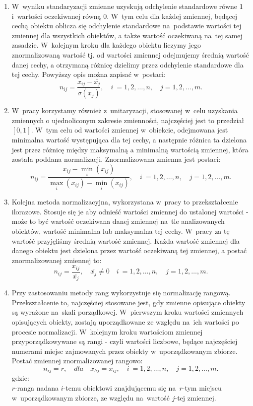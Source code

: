 \documentclass[12pt,a4paper]{report}
\begin{document}
\begin{enumerate}
\item W~wyniku standaryzacji zmienne uzyskują odchylenie standardowe równe 1 i~wartości oczekiwanej  równą 0. W~tym celu dla każdej zmiennej, będącej cechą obiektu oblicza się odchylenie standardowe na~podstawie wartości tej zmiennej dla wszystkich obiektów, a także wartość oczekiwaną na~tej samej zasadzie. W~kolejnym kroku dla każdego obiektu liczymy jego znormalizowaną wartość tj. od wartości zmiennej odejmujemy średnią wartość danej cechy, a otrzymaną różnicę dzielimy przez odchylenie standardowe dla tej cechy. Powyższy opis można zapisać w~postaci: 
$$
n_{ij}=\frac{x_{ij} - \overline{x_{j}}}{\sigma(x_j)}, \quad i~= 1,2, \ldots, n, \quad j=1,2,\ldots, m.
$$



\item W~pracy korzystamy również z~unitaryzacji, stosowanej w~celu uzyskania zmiennych o ujednoliconym zakresie zmienności, najczęściej jest to przedział $[0,1]$. W~tym celu od wartości zmiennej w~obiekcie, odejmowana jest minimalna wartość występująca dla tej cechy, a następnie różnica ta dzielona jest przez różnicę między maksymalną a minimalną wartością zmiennej, która została poddana normalizacji. Znormalizowana zmienna jest postaci:
$$
n_{ij}=\frac{x_{ij} - \min\limits_{i}(x_{ij})}{\max\limits_{i} (x_{ij}) - \min\limits_{i} (x_{ij})}, \quad i~= 1,2, \ldots, n, \quad j=1,2,\ldots, m. 
$$
\item Kolejna metoda normalizacyjna, wykorzystana w~pracy to przekształcenie ilorazowe. Stosuje się  je aby odnieść wartości zmiennej do ustalonej wartości - może to być wartość oczekiwana danej zmiennej na~tle analizowanych obiektów, wartość minimalna lub maksymalna tej cechy. W~pracy za tę wartość przyjęliśmy średnią wartość zmiennej. Każda wartość zmiennej dla danego obiektu jest dzielona przez wartość oczekiwaną tej zmiennej, a postać znormalizowanej zmiennej to:
$$
n_{ij}=\frac{x_{ij}}{\overline{x_j}}, \quad \overline{x_j} \neq 0 \quad i~= 1,2, \ldots, n, \quad j=1,2,\ldots, m.
$$ 
\item Przy zastosowaniu metody rang wykorzystuje się normalizację rangową. Przekształcenie to, najczęściej stosowane jest, gdy zmienne opisujące obiekty są wyrażone na~skali porządkowej. W~pierwszym kroku wartości zmiennych opisujących obiekty, zostają uporządkowane ze względu na~ich wartości po procesie normalizacji. W~kolejnym kroku wartościom zmiennej przyporządkowywane są rangi - czyli wartości liczbowe, będące najczęściej numerami miejsc zajmowanych przez obiekty w~uporządkowanym zbiorze. Postać zmiennej znormalizowanej rangowo:
$$
n_{ij}=r, \quad dla \quad x_{hj}=x_{ij}, \quad i~= 1,2, \ldots, n, \quad j=1,2,\ldots, m.
$$
gdzie:\\ 
$r$-ranga nadana $i$-temu obiektowi znajdującemu się na~$r$-tym miejscu w~uporządkowanym zbiorze, ze względu na~wartość $j$-tej zmiennej. 
\end{enumerate}
\end{document}
